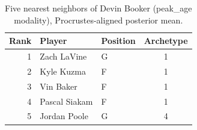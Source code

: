 \begin{table}[htbp]
  \centering\small
  \begin{tabular}{rllc}
    \toprule
    Rank & Player & Position & Archetype \\
    \midrule
    1 & Zach LaVine & G & 1 \\
    2 & Kyle Kuzma & F & 1 \\
    3 & Vin Baker & F & 1 \\
    4 & Pascal Siakam & F & 1 \\
    5 & Jordan Poole & G & 4 \\
    \bottomrule
  \end{tabular}
  \caption{Five nearest neighbors of Devin Booker (peak_age modality), Procrustes-aligned posterior mean.}
  \label{tab:Devin_Booker_neighbors_peak_age}
\end{table}

